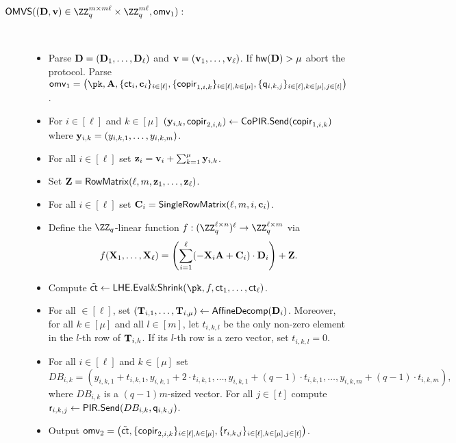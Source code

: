 \begin{description}
\item[$\OMVS((\Dn,\vn) \in \ZZ_q^{m\times m \ell}\times \ZZ_q^{m\ell},\omv_1):$]~
\begin{itemize}
    \item Parse $\mathbf{D}=(\mathbf{D}_1,\dots ,\mathbf{D}_\ell)$ and $\mathbf{v} = (\mathbf{v}_{1},\dots,\mathbf{v}_{\ell})$. If $\mathsf{hw}(\mathbf{D})>\mu$ abort the protocol. %
    Parse $\omv_1=\left(\pk,\vc{A},\{\ct_i, \vc{c}_i\}_{i\in [\ell]},\{\copir_{1,i,k}\}_{i\in [\ell],k\in[\mu]},\{\quer_{i,k,j}\}_{i \in [\ell],k\in[\mu], j \in [t]}\right)$.
    \item For $i \in [\ell]$ and $k\in[\mu]$ $(\mathbf{y}_{i,k},\mathsf{copir}_{2,i,k})\gets \mathsf{CoPIR}.\mathsf{Send}(\mathsf{copir}_{1,i,k})$ where $\mathbf{y}_{i,k}=(y_{i,k,1},\dots, y_{i,k,m})$. 
    \item For all $i\in[\ell]$ set $\mathbf{z}_i = \mathbf{v}_i +\sum_{k=1}^\mu \mathbf{y}_{i,k}$.
    \item Set $\mathbf{Z} = \mathsf{RowMatrix}(\ell,m,\mathbf{z}_1,\dots,\mathbf{z}_\ell)$.
    \item For all $i \in [\ell]$ set $\mathbf{C}_i = \mathsf{SingleRowMatrix}(\ell,m,i,\mathbf{c}_i)$.%
    \item Define the $\ZZ_q$-linear function $f: (\ZZ_q^{\ell \times n})^\ell \to \ZZ_q^{\ell \times m}$ via
    \[
    f(\mathbf{X}_1,\dots,\mathbf{X}_\ell)=\left( \sum_{i = 1}^\ell (-\mathbf{X}_i\mathbf{A} + \mathbf{C}_i)\cdot \mathbf{D}_i \right) + \mathbf{Z}.
    \]
    \item Compute $\tilde \ct \gets \LHE.\evalshrink(\pk,f,\ct_1,\dots,\ct_\ell)$.
    \item For all $\in[\ell]$, set $(\mathbf{T}_{i,1},\dots, \mathbf{T}_{i,\mu})\leftarrow\mathsf{AffineDecomp}(\mathbf{D}_i)$. 
    Moreover, for all $k\in[\mu]$ and all $l\in[m]$, let $t_{i,k,l}$ be the only non-zero element in the $l$-th row of $\mathbf{T}_{i,k}$. If its $l$-th row is a zero vector, set $t_{i,k,l}=0$.
    \item For all $i \in [\ell]$ and $k\in[\mu]$ set $${DB}_{i,k}=(y_{i,k,1}+t_{i,k,1},y_{i,k,1}+2\cdot t_{i,k,1},\dots,y_{i,k,1}+(q-1)\cdot t_{i,k,1},\dots,
    y_{i,k,m}+(q-1)\cdot t_{i,k,m}),$$
    where $DB_{i,k}$ is a $(q-1)m$-sized vector.
    For all $j \in [t]$  compute $\mathsf{r}_{i,k,j} \gets \mathsf{PIR}.\mathsf{Send}(DB_{i,k},\mathsf{q}_{i,k,j})$.
    \item Output $\mathsf{omv}_2=\left(\tilde{\mathsf{ct}},\{\mathsf{copir}_{2,i,k}\}_{i\in[\ell],k\in[\mu]}, \{\mathsf{r}_{i,k,j}\}_{i \in [\ell],k\in[\mu] ,j \in [t]} \right)$.
\end{itemize}


\end{description}
